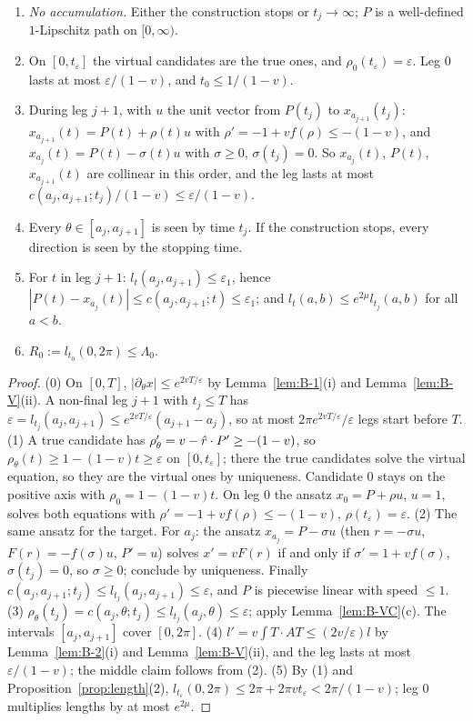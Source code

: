 \begin{lemma}[Construction C]\label{lem:B-C}
\begin{enumerate}
\item[(0)] \emph{No accumulation.} Either the construction stops or $t_j\to\infty$; $P$ is a well-defined $1$-Lipschitz path on
$[0,\infty)$.
\item[(1)] On $[0,t_\varepsilon]$ the virtual candidates are the true ones, and $\rho_0(t_\varepsilon)=\varepsilon$. Leg $0$ lasts at
most $\varepsilon/(1-v)$, and $t_0\le1/(1-v)$.
\item[(2)] During leg $j+1$, with $u$ the unit vector from $P(t_j)$ to $x_{a_{j+1}}(t_j)$: $x_{a_{j+1}}(t)=P(t)+\rho(t)u$ with
$\rho'=-1+vf(\rho)\le-(1-v)$, and $x_{a_j}(t)=P(t)-\sigma(t)u$ with $\sigma\ge0$, $\sigma(t_j)=0$. So $x_{a_j}(t)$, $P(t)$,
$x_{a_{j+1}}(t)$ are collinear in this order, and the leg lasts at most $c(a_j,a_{j+1};t_j)/(1-v)\le\varepsilon/(1-v)$.
\item[(3)] Every $\theta\in[a_j,a_{j+1}]$ is seen by time $t_j$. If the construction stops, every direction is seen by the stopping
time.
\item[(4)] For $t$ in leg $j+1$: $l_t(a_j,a_{j+1})\le\varepsilon_1$, hence
$|P(t)-x_{a_j}(t)|\le c(a_j,a_{j+1};t)\le\varepsilon_1$; and $l_t(a,b)\le e^{2\mu}l_{t_j}(a,b)$ for all $a<b$.
\item[(5)] $R_0:=l_{t_0}(0,2\pi)\le\Lambda_0$.
\end{enumerate}
\end{lemma}
\begin{proof}
(0) On $[0,T]$, $|\partial_\theta x|\le e^{2vT/\varepsilon}$ by Lemma~\ref{lem:B-1}(i) and Lemma~\ref{lem:B-V}(ii). A non-final leg
$j+1$ with $t_j\le T$ has $\varepsilon=l_{t_j}(a_j,a_{j+1})\le e^{2vT/\varepsilon}(a_{j+1}-a_j)$, so at most
$2\pi e^{2vT/\varepsilon}/\varepsilon$ legs start before $T$.
(1) A true candidate has $\rho_\theta'=v-\hat r\cdot P'\ge-(1-v)$, so $\rho_\theta(t)\ge1-(1-v)t\ge\varepsilon$ on $[0,t_\varepsilon]$;
there the true candidates solve the virtual equation, so they are the virtual ones by uniqueness. Candidate $0$ stays on the positive
axis with $\rho_0=1-(1-v)t$. On leg $0$ the ansatz $x_0=P+\rho u$, $u=1$, solves both equations with
$\rho'=-1+vf(\rho)\le-(1-v)$, $\rho(t_\varepsilon)=\varepsilon$.
(2) The same ansatz for the target. For $a_j$: the ansatz $x_{a_j}=P-\sigma u$ (then $r=-\sigma u$, $F(r)=-f(\sigma)u$, $P'=u$)
solves $x'=vF(r)$ if and only if $\sigma'=1+vf(\sigma)$, $\sigma(t_j)=0$, so $\sigma\ge0$; conclude by uniqueness. Finally
$c(a_j,a_{j+1};t_j)\le l_{t_j}(a_j,a_{j+1})\le\varepsilon$, and $P$ is piecewise linear with speed $\le1$.
(3) $\rho_\theta(t_j)=c(a_j,\theta;t_j)\le l_{t_j}(a_j,\theta)\le\varepsilon$; apply Lemma~\ref{lem:B-VC}(c). The intervals
$[a_j,a_{j+1}]$ cover $[0,2\pi]$.
(4) $l'=v\int T\cdot AT\le(2v/\varepsilon)l$ by Lemma~\ref{lem:B-2}(i) and Lemma~\ref{lem:B-V}(ii), and the leg lasts at most
$\varepsilon/(1-v)$; the middle claim follows from (2).
(5) By (1) and Proposition~\ref{prop:length}(2), $l_{t_\varepsilon}(0,2\pi)\le2\pi+2\pi vt_\varepsilon<2\pi/(1-v)$; leg $0$
multiplies lengths by at most $e^{2\mu}$.
\end{proof}

